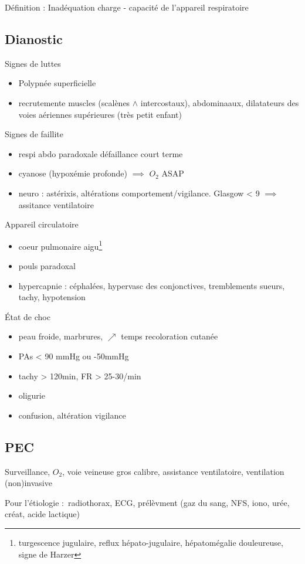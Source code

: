 Définition : Inadéquation charge - capacité de l'appareil respiratoire

\subsection{Dianostic}
Signes de luttes
\begin{itemize}
  \item Polypnée superficielle
  \item recrutemente muscles (scalènes $\wedge$ intercostaux), abdominaaux,
    dilatateurs des voies aériennes supérieures (très petit enfant)
\end{itemize}
Signes de faillite
\begin{itemize}
  \item respi abdo paradoxale \skull défaillance court terme
  \item cyanose (hypoxémie profonde) $\implies$ $O_2$ ASAP
  \item neuro : astérixis, altérations comportement/vigilance. Glasgow < 9
    $\implies$ assitance ventilatoire
\end{itemize}
Appareil circulatoire
\begin{itemize}
  \item coeur pulmonaire aigu\footnote{turgescence jugulaire, reflux
    hépato-jugulaire, hépatomégalie douleureuse, signe de Harzer}
  \item pouls paradoxal
  \item hypercapnie : {céphalées, hypervasc des conjonctives}, {tremblements
    sueurs, tachy, hypotension}
\end{itemize}
État de choc 
\begin{itemize}
  \item peau froide, marbrures, $\nearrow$ temps recoloration cutanée
  \item PAs < 90 mmHg ou -50mmHg
  \item tachy > 120min, FR > 25-30/min
  \item oligurie
  \item confusion, altération vigilance
\end{itemize}

\subsection{PEC}
Surveillance, $O_2$, voie veineuse gros calibre, assistance ventilatoire,
ventilation (non)invasive

Pour l'étiologie : radiothorax, ECG, prélèvment (gaz du sang, NFS, iono, urée,
créat, acide lactique)

